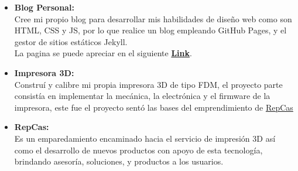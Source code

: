 \begin{itemize}
    \item \textbf{Blog Personal:}\\
    \vspace{3pt}
    Cree mi propio blog para desarrollar mis habilidades de diseño web como son HTML, CSS y JS, por lo que realice un blog empleando GitHub Pages, y el gestor de sitios estáticos Jekyll.\\
    \vspace{3pt}
    La pagina se puede apreciar en el siguiente \href{www.dacaprogramming.com}{\textbf{Link}}.
    
    \divider
    
    \item \textbf{Impresora 3D:}\\
    \vspace{3pt}
    Construí y calibre mi propia impresora 3D de tipo FDM, el proyecto parte consistía en implementar la mecánica, la electrónica y el firmware de la impresora, este fue el proyecto sentó las bases del emprendimiento de  \href{https://www.instagram.com/repcas.co/}{RepCas}
    
    \divider
    
    \item \textbf{RepCas:}\\
    Es un emparedamiento encaminado hacia el servicio de impresión 3D así como el desarrollo de nuevos productos con apoyo de esta tecnología, brindando asesoría, soluciones, y productos a los usuarios.
    
\end{itemize}
